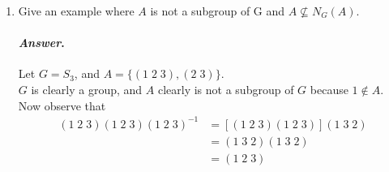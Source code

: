 \documentclass[11pt, reqno]{amsart}
\theoremstyle{plain}
\theoremstyle{definition}
\theoremstyle{example}
\newenvironment{ans}{\color{black}\medskip \paragraph*{\emph{Answer}.}}{\hfill \break  $~\!\!$ \dotfill \medskip }
\begin{document}
\begin{enumerate}[1.]
\begin{enumerate}
\begin{proof}
Thus, we have that $H \subset N_G(H)$. Now need to show that $N_G(H)$ is a group in order to establish that $H \leqslant N_G(H)$.\\

We can do this by showing that $N_G(H) \leqslant G$. First, $N_G(H) \neq \emptyset$ because $1 \in H \implies 1 \in N_G(H)$.\\

Now assume $x, y \in N_G(H)$. That is, $xHx^{-1} = H$ and $yHy^{-1} = H$.\\

Note that, if we multiply on the left by $y^{-1}$ and on the right by $y$ in the second equality, we get
\begin{align*}
H = y^{-1}Hy
\end{align*}

Hence, $y^{-1} \in N_G(H)$ and $N_G(H)$ is closed under inverses. Now
\begin{align*}
(xy)H(xy)^{-1} &= (xy)H(y^{-1}x^{-1})\\
&= x(yHy^{-1})x^{-1}\
&= xHx^{-1}\\
&= H
\end{align*} 

so $xy \in N_G(H)$ and $N_G(H)$ is closed under product. Hence $N_G(H) \leqslant G$ and so $N_G(H)$ is a group.\\

Since $H \leqslant G$, we know $H$ is a group, and since $H \subset N_G(H)$ and $N_G(H)$ group, we have that
\begin{align*}
H \leqslant N_G(H)
\end{align*}

as required.
\end{proof}

\item Give an example where $A$ is not a subgroup of G and $A \not\subseteq N_G(A)$. 
\begin{ans}
Let $G = S_3$, and $A = \{(1 \; 2 \; 3), (2 \; 3)\}$.\\

$G$ is clearly a group, and $A$ clearly is not a subgroup of $G$ because $1 \not\in A$.\\

Now observe that
\begin{align*}
(1 \; 2 \; 3)(1 \; 2 \; 3)(1 \; 2 \; 3)^{-1} &= [(1 \; 2 \; 3)(1 \; 2 \; 3)](1 \; 3 \; 2)\\
&= (1 \; 3 \; 2)(1 \; 3 \; 2)\\
&= (1 \; 2 \; 3)
\end{align*}


\end{ans}
\end{enumerate}
\end{enumerate}
\end{document}
